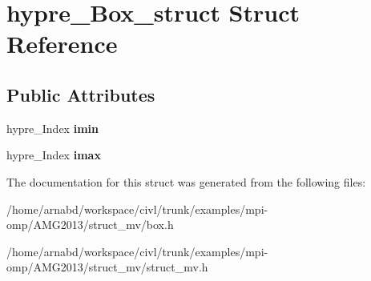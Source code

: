 \hypertarget{structhypre__Box__struct}{}\section{hypre\+\_\+\+Box\+\_\+struct Struct Reference}
\label{structhypre__Box__struct}
\subsection*{Public Attributes}
\begin{DoxyCompactItemize}
\item 
\hypertarget{structhypre__Box__struct_a7077583e214525e887928d1e2b12004c}{}hypre\+\_\+\+Index {\bfseries imin}\label{structhypre__Box__struct_a7077583e214525e887928d1e2b12004c}

\item 
\hypertarget{structhypre__Box__struct_aead798eb0f86f1244aa0a0c9bc36076b}{}hypre\+\_\+\+Index {\bfseries imax}\label{structhypre__Box__struct_aead798eb0f86f1244aa0a0c9bc36076b}

\end{DoxyCompactItemize}


The documentation for this struct was generated from the following files\+:\begin{DoxyCompactItemize}
\item 
/home/arnabd/workspace/civl/trunk/examples/mpi-\/omp/\+A\+M\+G2013/struct\+\_\+mv/box.\+h\item 
/home/arnabd/workspace/civl/trunk/examples/mpi-\/omp/\+A\+M\+G2013/struct\+\_\+mv/struct\+\_\+mv.\+h\end{DoxyCompactItemize}
